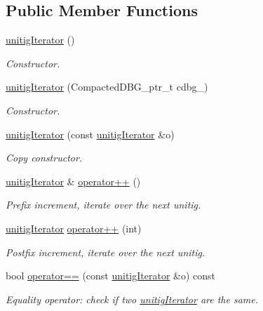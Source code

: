 \subsection*{Public Member Functions}
\begin{DoxyCompactItemize}
\item 
\hyperlink{classunitigIterator_a1bd469cfd276720b53c56ba810fccea5}{unitig\+Iterator} ()
\begin{DoxyCompactList}\small\item\em Constructor. \end{DoxyCompactList}\item 
\hyperlink{classunitigIterator_a3a1d4af1f86c340ef92197cd11baa80a}{unitig\+Iterator} (Compacted\+D\+B\+G\+\_\+ptr\+\_\+t cdbg\+\_\+)
\begin{DoxyCompactList}\small\item\em Constructor. \end{DoxyCompactList}\item 
\hyperlink{classunitigIterator_af9a7540eb106197afa5b3befd7bf3ac9}{unitig\+Iterator} (const \hyperlink{classunitigIterator}{unitig\+Iterator} \&o)
\begin{DoxyCompactList}\small\item\em Copy constructor. \end{DoxyCompactList}\item 
\hyperlink{classunitigIterator}{unitig\+Iterator} \& \hyperlink{classunitigIterator_a9ef74119d337be7ba4b32a8d61318605}{operator++} ()
\begin{DoxyCompactList}\small\item\em Prefix increment, iterate over the next unitig. \end{DoxyCompactList}\item 
\hyperlink{classunitigIterator}{unitig\+Iterator} \hyperlink{classunitigIterator_aafb3c6c0095f40975ada699e738654ff}{operator++} (int)
\begin{DoxyCompactList}\small\item\em Postfix increment, iterate over the next unitig. \end{DoxyCompactList}\item 
bool \hyperlink{classunitigIterator_a5c2d4c59d6024f71a8512e0cbae036fa}{operator==} (const \hyperlink{classunitigIterator}{unitig\+Iterator} \&o) const
\begin{DoxyCompactList}\small\item\em Equality operator\+: check if two \hyperlink{classunitigIterator}{unitig\+Iterator} are the same. \end{DoxyCompactList}\item 

\end{DoxyCompactItemize}
